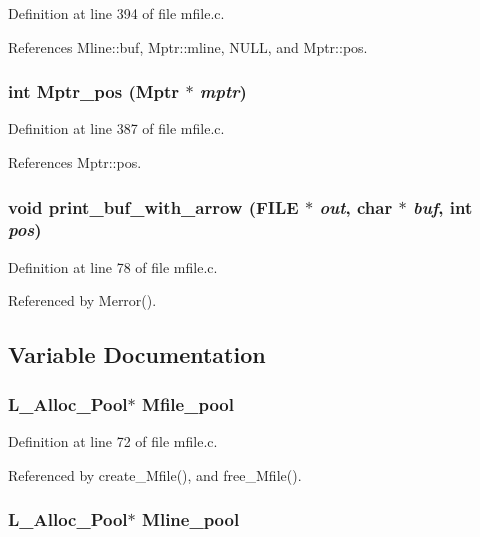 Definition at line 394 of file mfile.c.

References Mline::buf, Mptr::mline, NULL, and Mptr::pos.
\subsubsection{\setlength{\rightskip}{0pt plus 5cm}int Mptr\_\-pos (\bf{Mptr} $\ast$ {\em mptr})}\label{mfile_8h_e28a4a586b7c05dfa562605ba3d9e45c}




Definition at line 387 of file mfile.c.

References Mptr::pos.
\subsubsection{\setlength{\rightskip}{0pt plus 5cm}void print\_\-buf\_\-with\_\-arrow (FILE $\ast$ {\em out}, char $\ast$ {\em buf}, int {\em pos})}\label{mfile_8h_e37a5305948b839a902a0e8fc79b9dce}




Definition at line 78 of file mfile.c.

Referenced by Merror().

\subsection{Variable Documentation}
\subsubsection{\setlength{\rightskip}{0pt plus 5cm}\bf{L\_\-Alloc\_\-Pool}$\ast$ \bf{Mfile\_\-pool}}\label{mfile_8h_34fe8c10585e8ec69a209e452195fa80}




Definition at line 72 of file mfile.c.

Referenced by create\_\-Mfile(), and free\_\-Mfile().
\subsubsection{\setlength{\rightskip}{0pt plus 5cm}\bf{L\_\-Alloc\_\-Pool}$\ast$ \bf{Mline\_\-pool}}\label{mfile_8h_3af5625a492421cf10b0f3788ea61b0c}





